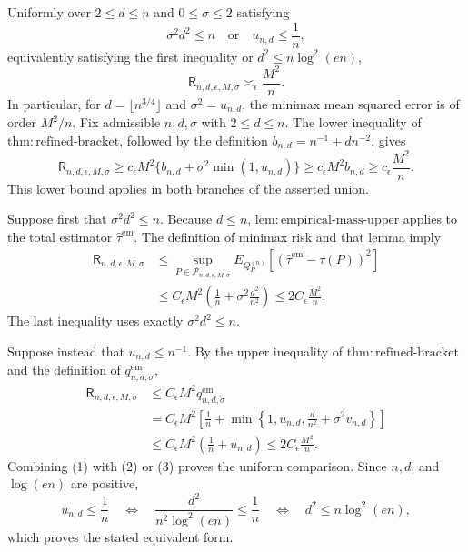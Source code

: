 Uniformly over \(2\le d\le n\) and \(0\le\sigma\le2\) satisfying
\[
 \sigma^2d^2\le n
 \quad\text{or}\quad
 u_{n,d}\le \frac1n,
\]
equivalently satisfying the first inequality or \(d^2\le n\log^2(en)\),
\[
 \mathsf R_{n,d,\epsilon,M,\sigma}\asymp_{\epsilon}\frac{M^2}{n}.
\]
In particular, for \(d=\lfloor n^{3/4}\rfloor\) and \(\sigma^2=u_{n,d}\), the minimax mean squared error is of order \(M^2/n\).
Fix admissible \(n,d,\sigma\) with \(2\le d\le n\).  The lower inequality of \(\mathrm{thm:refined\text{-}bracket}\), followed by the definition \(b_{n,d}=n^{-1}+dn^{-2}\), gives
\[
 \mathsf R_{n,d,\epsilon,M,\sigma}
 \ge c_{\epsilon}M^2\{b_{n,d}+\sigma^2\min(1,u_{n,d})\}
 \ge c_{\epsilon}M^2b_{n,d}
 \ge c_{\epsilon}\frac{M^2}{n}.                                      \tag{1}
\]
This lower bound applies in both branches of the asserted union.

Suppose first that \(\sigma^2d^2\le n\).  Because \(d\le n\), \(\mathrm{lem:empirical\text{-}mass\text{-}upper}\) applies to the total estimator \(\widehat\tau^{\mathrm{em}}\).  The definition of minimax risk and that lemma imply
\[
 \begin{aligned}
 \mathsf R_{n,d,\epsilon,M,\sigma}
 &\le \sup_{P\in\mathcal P_{n,d,\epsilon,M,\sigma}}
 E_{Q_P^{(n)}}[(\widehat\tau^{\mathrm{em}}-\tau(P))^2]\\
 &\le C_{\epsilon}M^2\left(\frac1n+\sigma^2\frac{d^2}{n^2}\right)
 \le 2C_{\epsilon}\frac{M^2}{n}.                                    \tag{2}
 \end{aligned}
\]
The last inequality uses exactly \(\sigma^2d^2\le n\).

Suppose instead that \(u_{n,d}\le n^{-1}\).  By the upper inequality of \(\mathrm{thm:refined\text{-}bracket}\) and the definition of \(q_{n,d,\sigma}^{\mathrm{em}}\),
\[
 \begin{aligned}
 \mathsf R_{n,d,\epsilon,M,\sigma}
 &\le C_{\epsilon}M^2q_{n,d,\sigma}^{\mathrm{em}}\\
 &=C_{\epsilon}M^2\left[\frac1n+
 \min\left\{1,u_{n,d},\frac d{n^2}+\sigma^2v_{n,d}\right\}\right]\\
 &\le C_{\epsilon}M^2\left(\frac1n+u_{n,d}\right)
 \le 2C_{\epsilon}\frac{M^2}{n}.                                    \tag{3}
 \end{aligned}
\]
Combining (1) with (2) or (3) proves the uniform comparison.  Since \(n,d\), and \(\log(en)\) are positive,
\[
 u_{n,d}\le\frac1n
 \quad\Longleftrightarrow\quad
 \frac{d^2}{n^2\log^2(en)}\le\frac1n
 \quad\Longleftrightarrow\quad
 d^2\le n\log^2(en),                                                   \tag{4}
\]
which proves the stated equivalent form.

